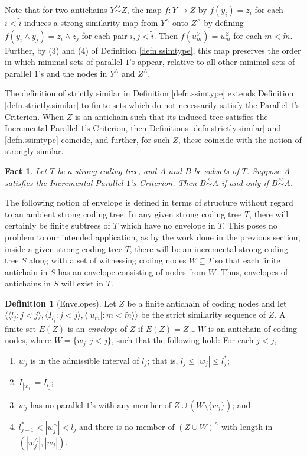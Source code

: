\documentclass{amsart}
\newtheorem{fact}[thm]{Fact}
\theoremstyle{remark}
\theoremstyle{definition}
\newtheorem{defn}[thm]{Definition}
\theoremstyle{remark}
\newcommand{\sse}{\subseteq}
\newcommand{\ssim}{\stackrel{s}{\sim}}
\newcommand{\sssim}{\stackrel{ss}{\sim}}
\newcommand{\ra}{\rightarrow}
\newcommand{\lgl}{\langle}
\newcommand{\rgl}{\rangle}
\newcommand{\POC}{Parallel $1$'s Criterion}
\newcommand{\IPOC}{Incremental Parallel $1$'s Criterion}
\begin{document}
Note that  for two  antichains  $Y\sssim Z$,
 the map $f:Y\ra Z$ by $f(y_i)=z_i$ for each $i<\tilde{i}$ induces a strong similarity map from $Y^{\wedge}$ onto $Z^{\wedge}$ by defining $f(y_i\wedge y_j)=z_i\wedge z_j$
for each pair  $i,j<\tilde{i}$.
Then  $f(u^Y_m)=u^Z_m$ for each $m<\tilde{m}$.
Further,
by (3) and  (4) of Definition \ref{defn.ssimtype},
 this map preserves the order in which minimal sets of parallel $1$'s appear, relative to all  other  minimal sets of parallel $1$'s and the nodes in $Y^{\wedge}$ and $Z^{\wedge}$.


The definition of strictly similar in
Definition \ref{defn.ssimtype}
extends Definition \ref{defn.strictly.similar}
to finite sets which do not necessarily satisfy the \POC.
When $Z$ is an antichain such that its induced tree satisfies the \IPOC,
then Definitions \ref{defn.strictly.similar} and \ref{defn.ssimtype} coincide, and further,  for such $Z$, these coincide with the notion of  strongly similar.



\begin{fact}\label{fact.Claim0}
Let $T$ be a strong coding tree, and $A$ and $B$ be subsets of $T$.
Suppose $A$ satisfies the \IPOC.
Then $B\ssim A$ if and only if $B\sssim A$.
\end{fact}



The following notion of envelope is defined in terms of structure without regard to an ambient strong coding tree.
In any given strong coding tree $T$, there will
 certainly be  finite subtrees  of  $T$ which have no envelope in $T$.
This poses no problem to our intended application,
as  by the work done in the previous section,
inside a given strong coding tree $T$, there will be
an incremental strong coding tree  $S$ along with a set of witnessing coding nodes $W\sse T$ so that each finite antichain in  $S$ has an   envelope consisting of nodes from $W$.
Thus, envelopes of antichains in $S$ will exist in $T$.



\begin{defn}[Envelopes]\label{defn.envelope}
Let $Z$ be a finite   antichain of coding nodes and
let
$\lgl
\lgl l_j:j<\tilde{j}\rgl,
\lgl I_{l_j}:j<\tilde{j}\rgl,
\lgl |u_m|:m<\tilde{m}\rgl\rgl$
be the strict similarity sequence of $Z$.
A finite set  $E(Z)$  is an {\em   envelope} of $Z$ if
$E(Z)=Z\cup W$ is an antichain of coding nodes,
where
$W=\{w_j:j <\tilde{j}\}$,
such that the following hold:
 For each $j<\tilde{j}$,
\begin{enumerate}
\item
$w_j$ is in the admissible interval of $l_j$; that is,
$l_j\le |w_j|\le l_j^*$;
\item
$I_{|w_j|}=I_{l_j}$;
\item
 $w_j$ has no parallel $1$'s with any member of $Z\cup (W\setminus\{w_j\})$;
and
\item
 $l^*_{j-1}<|w_j^{\wedge}|<l_j$ and there is no member of
 $(Z\cup W)^{\wedge}$ with length in $(|w_j^{\wedge}|,|w_j|)$.
\end{enumerate}
\end{defn}
\end{document}
